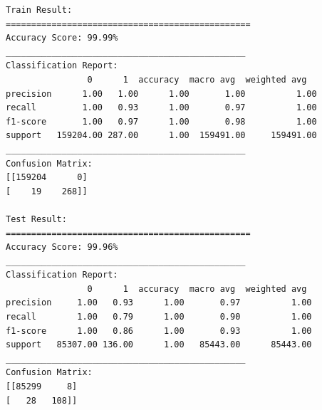 \documentclass[9pt,a4paper,twoside]{rho-class/rho}
\begin{document}
\begin{verbatim}
Train Result:
================================================
Accuracy Score: 99.99%
_______________________________________________
Classification Report:
                0      1  accuracy  macro avg  weighted avg
precision      1.00   1.00      1.00       1.00          1.00
recall         1.00   0.93      1.00       0.97          1.00
f1-score       1.00   0.97      1.00       0.98          1.00
support   159204.00 287.00      1.00  159491.00     159491.00
_______________________________________________
Confusion Matrix: 
[[159204      0]
[    19    268]]

Test Result:
================================================
Accuracy Score: 99.96%
_______________________________________________
Classification Report:
                0      1  accuracy  macro avg  weighted avg
precision     1.00   0.93      1.00       0.97          1.00
recall        1.00   0.79      1.00       0.90          1.00
f1-score      1.00   0.86      1.00       0.93          1.00
support   85307.00 136.00      1.00   85443.00      85443.00
_______________________________________________
Confusion Matrix: 
[[85299     8]
[   28   108]]
\end{verbatim}
\normalsize  %
\end{document}
